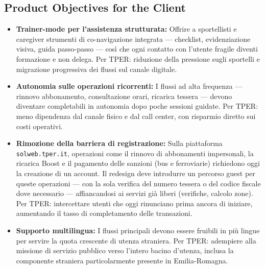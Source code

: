 ﻿\documentclass[11pt,a4paper]{article}
\begin{document}
\subsection{Product Objectives for the Client}
\begin{itemize}[leftmargin=*]

    \item \textbf{Trainer-mode per l'assistenza strutturata:}
    Offrire a sportellisti e caregiver strumenti di co-navigazione
    integrata --- checklist, evidenziazione visiva, guida passo-passo ---
    così che ogni contatto con l'utente fragile diventi formazione e
    non delega. Per TPER: riduzione della pressione sugli sportelli e
    migrazione progressiva dei flussi sul canale digitale.

    \item \textbf{Autonomia sulle operazioni ricorrenti:}
    I flussi ad alta frequenza --- rinnovo abbonamento,
    consultazione orari, ricarica tessera --- devono diventare
    completabili in autonomia
    dopo poche sessioni guidate. Per TPER: meno dipendenza dal canale
    fisico e dal call center, con risparmio diretto sui costi operativi.

    \item \textbf{Rimozione della barriera di registrazione:}
    Sulla piattaforma \texttt{solweb.tper.it}, operazioni come il rinnovo
    di abbonamenti impersonali, la ricarica Boost e il pagamento delle
    sanzioni (bus e ferroviarie) richiedono oggi la creazione di un
    account. Il redesign deve introdurre un percorso guest per queste
    operazioni --- con la sola verifica del numero tessera o del codice
    fiscale dove necessario --- affiancandosi ai servizi già liberi
    (verifiche, calcolo zone). Per TPER: intercettare utenti che oggi
    rinunciano prima ancora di iniziare, aumentando il tasso di
    completamento delle transazioni.

    \item \textbf{Supporto multilingua:}
    I flussi principali devono essere fruibili in più lingue per servire
    la quota crescente di utenza straniera. Per TPER: adempiere alla
    missione di servizio pubblico verso l'intero bacino d'utenza,
    inclusa la componente straniera particolarmente presente in
    Emilia-Romagna.

\end{itemize}
\end{document}
